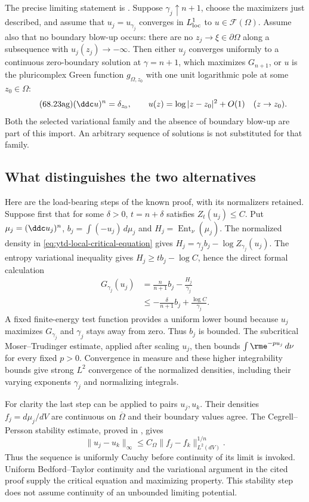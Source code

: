 The precise limiting statement is
\cite[Theorem~7.4]{BB22MTPublished}. Suppose
$\gamma_j\uparrow n+1$, choose the maximizers just described,
and assume that $u_j=u_{\gamma_j}$ converges in $L^1_{\rm loc}$
to $u\in\mathcal F(\Omega)$. Assume also that no boundary
blow-up occurs: there are no $z_j\to\xi\in\partial\Omega$
along a subsequence with $u_j(z_j)\to-\infty$.
Then either $u_j$ converges uniformly to a continuous zero-boundary
solution at $\gamma=n+1$, which maximizes $G_{n+1}$, or
$u$ is the pluricomplex Green function $g_{\Omega,z_0}$ with
one unit logarithmic pole at some $z_0\in\Omega$:
\[
\tag{68.23ag}\label{eq:ytd-local-critical-green}
 (\ddc u)^n=\delta_{z_0},\qquad
 u(z)=\log|z-z_0|^2+O(1)\quad(z\to z_0).
\]
Both the selected variational family and the absence of boundary
blow-up are part of this import. An arbitrary sequence of solutions
is not substituted for that family.

\subsection{What distinguishes the two alternatives}
\label{sec:ytd-local-critical-mechanism}

Here are the load-bearing steps of the known proof, with its
normalizers retained. Suppose first that for some $\delta>0$,
$t=n+\delta$ satisfies $Z_t(u_j)\leq C$. Put
$\mu_j=(\ddc u_j)^n$, $b_j=\int(-u_j)\,d\mu_j$ and
$H_j=\operatorname{Ent}_\nu(\mu_j)$. The normalized density in
\eqref{eq:ytd-local-critical-equation} gives
$H_j=\gamma_j b_j-\log Z_{\gamma_j}(u_j)$.
The entropy variational inequality gives
$H_j\geq t b_j-\log C$, hence the direct formal calculation
\[
\tag{68.23ah}\label{eq:ytd-local-critical-energy-control}
\begin{aligned}
 G_{\gamma_j}(u_j)
   &=\frac{n}{n+1}b_j-\frac{H_j}{\gamma_j}\\
   &\leq-\frac{\delta}{n+1}b_j+\frac{\log C}{\gamma_j}.
\end{aligned}
\]
A fixed finite-energy test function provides a uniform lower bound
because $u_j$ maximizes $G_{\gamma_j}$ and $\gamma_j$ stays
away from zero. Thus $b_j$ is bounded. The subcritical
Moser--Trudinger estimate, applied after scaling $u_j$, then
bounds $\int\rme^{-p u_j}\,d\nu$ for every fixed $p>0$.
Convergence in measure and these higher integrability bounds give
strong $L^2$ convergence of the normalized densities, including
their varying exponents $\gamma_j$ and normalizing integrals.

For clarity the last step can be applied to pairs $u_j,u_k$.
Their densities $f_j=d\mu_j/dV$ are continuous on
$\overline\Omega$ and their boundary values agree. The
Cegrell--Persson stability estimate, proved in
\cite[Theorems~5.1(i) and~5.3]{Blocki96HyperconvexPublished},
gives
\[
 \|u_j-u_k\|_\infty
       \leq C_\Omega\|f_j-f_k\|_{L^2(dV)}^{1/n}.
\]
Thus the sequence is uniformly Cauchy before continuity of its
limit is invoked. Uniform Bedford--Taylor continuity and the
variational argument in the cited proof supply the critical
equation and maximizing property. This stability step does not
assume continuity of an unbounded limiting potential.

